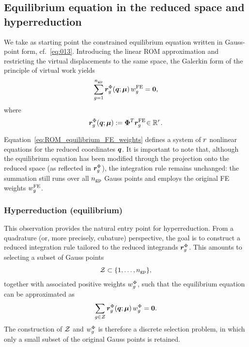 \documentclass[11pt,a4paper]{article}
\newcommand{\PROMPT}[1]{ }
\begin{document}
\subsection{Equilibrium equation in the reduced space and hyperreduction}
 \label{subsec:Galerkin_hyperreduction}

\PROMPT{}
%
\PROMPT{}



We take as starting point the constrained equilibrium equation written in
Gauss-point form, cf.~\eqref{eq:013}. Introducing the linear ROM approximation
and restricting the virtual displacements to the same space, the Galerkin form
of the principle of virtual work yields
\begin{equation}
\label{eq:ROM_equilibrium_FE_weights}
      \sum_{g=1}^{n_{\mathrm{gp}}}
    \bm{r}^{\Phi}_{g}(\bm{q};\bm{\mu})\,w^{\mathrm{FE}}_{g}
    =
    \bm{0},
\end{equation}
where
\begin{equation}
\label{eq:rPhi_definition}
    \bm{r}^{\Phi}_{g}(\bm{q};\bm{\mu})
    :=
    \bm{\Phi}^T
    \bm{r}^{\mathrm{FE}}_{g}\!     \in \mathbb{R}^{r}.
\end{equation}

Equation~\eqref{eq:ROM_equilibrium_FE_weights} defines a system of $r$
nonlinear equations for the reduced coordinates $\bm{q}$. It is important to note
that, although the equilibrium equation has been modified through the projection
onto the reduced space (as reflected in $\bm{r}^{\Phi}_{g}$), the integration rule remains
unchanged: the summation still runs over all $n_{\mathrm{gp}}$ Gauss points and employs the
original FE weights $w^{\mathrm{FE}}_{g}$.


\subsubsection{Hyperreduction (equilibrium)}

This observation provides the natural entry point for hyperreduction. From a
quadrature (or, more precisely, cubature) perspective, the goal is to construct a
reduced integration rule tailored to the reduced integrands $\bm{r}^{\Phi}_{g}$. This
amounts to selecting a subset of Gauss points
\[
    \mathcal{Z} \subset \{1,\ldots,n_{\mathrm{gp}}\},
\]
together with associated positive weights $w^{\Phi}_{g}$, such that the equilibrium
equation can be approximated as
\begin{equation}
\label{eq:013aaa}
      \sum_{g\in \mathcal{Z}}
    \bm{r}^{\Phi}_{g}(\bm{q};\bm{\mu})\,w^{\Phi}_{g}
    =
    \bm{0}.
\end{equation}
The construction of $\mathcal{Z}$ and $w^{\Phi}_{g}$ is therefore a discrete selection
problem, in which only a small subset of the original Gauss points is retained.
\end{document}
